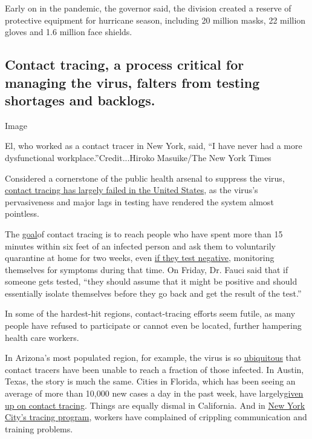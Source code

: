 Early on in the pandemic, the governor said, the division created a
reserve of protective equipment for hurricane season, including 20
million masks, 22 million gloves and 1.6 million face shields.

\hypertarget{contact-tracing-a-process-critical-for-managing-the-virus-falters-from-testing-shortages-and-backlogs}{%
\subsection{Contact tracing, a process critical for managing the virus,
falters from testing shortages and
backlogs.}\label{contact-tracing-a-process-critical-for-managing-the-virus-falters-from-testing-shortages-and-backlogs}}

Image

El, who worked as a contact tracer in New York, said, ``I have never had
a more dysfunctional workplace.''Credit...Hiroko Masuike/The New York
Times

Considered a cornerstone of the public health arsenal to suppress the
virus,
\href{https://www.nytimes.com/2020/07/31/health/covid-contact-tracing-tests.html}{contact
tracing has largely failed in the United States}, as the virus's
pervasiveness and major lags in testing have rendered the system almost
pointless.

The
\href{https://www.cdc.gov/coronavirus/2019-ncov/php/contact-tracing/contact-tracing-plan/contact-tracing.html}{goal}of
contact tracing is to reach people who have spent more than 15 minutes
within six feet of an infected person and ask them to voluntarily
quarantine at home for two weeks, even
\href{https://www.cdc.gov/coronavirus/2019-ncov/symptoms-testing/testing.html}{if
they test negative}, monitoring themselves for symptoms during that
time. On Friday, Dr. Fauci said that if someone gets tested, ``they
should assume that it might be positive and should essentially isolate
themselves before they go back and get the result of the test.''

In some of the hardest-hit regions, contact-tracing efforts seem futile,
as many people have refused to participate or cannot even be located,
further hampering health care workers.

In Arizona's most populated region, for example, the virus is so
\href{https://www.azfamily.com/news/continuing_coverage/coronavirus_coverage/contact-tracing-important-but-less-useful-with-spiking-cases-maricopa-county-says/article_57d55328-bb4b-11ea-8718-8b1cf4ab4137.html}{ubiquitous}
that contact tracers have been unable to reach a fraction of those
infected. In Austin, Texas, the story is much the same. Cities in
Florida, which has been seeing an average of more than 10,000 new cases
a day in the past week, have
largely\href{https://www.nbcmiami.com/news/local/miami-beach-mayor-urges-desantis-to-address-failures-of-floridas-contact-tracing-program/2268324/}{given
up on contact tracing}. Things are equally dismal in California. And in
\href{https://www.nytimes.com/2020/07/29/nyregion/new-york-contact-tracing.html}{New
York City's tracing program}, workers have complained of crippling
communication and training problems.

